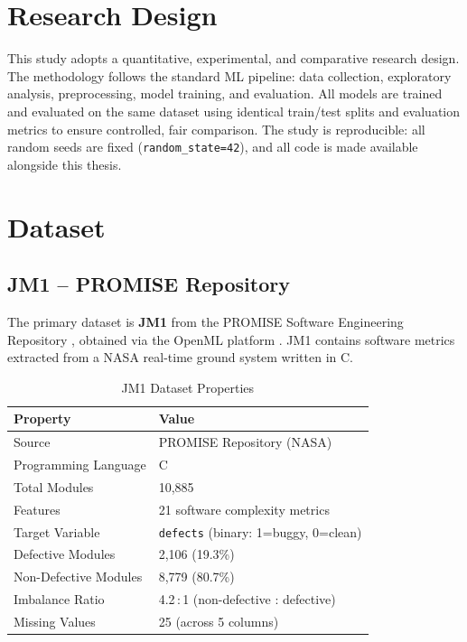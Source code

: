 \documentclass[12pt,a4paper,oneside]{report}
\begin{document}
\section{Research Design}

This study adopts a quantitative, experimental, and comparative research design. The methodology follows the standard ML pipeline: data collection, exploratory analysis, preprocessing, model training, and evaluation. All models are trained and evaluated on the same dataset using identical train/test splits and evaluation metrics to ensure controlled, fair comparison. The study is reproducible: all random seeds are fixed (\texttt{random\_state=42}), and all code is made available alongside this thesis.

\section{Dataset}

\subsection{JM1 -- PROMISE Repository}

The primary dataset is \textbf{JM1} from the PROMISE Software Engineering Repository \citep{promise}, obtained via the OpenML platform \citep{openml}. JM1 contains software metrics extracted from a NASA real-time ground system written in C.

\begin{table}[H]
  \centering
  \caption{JM1 Dataset Properties}
  \label{tab:jm1_properties}
  \begin{tabular}{L{55mm}L{80mm}}
    \toprule
    \textbf{Property} & \textbf{Value} \\
    \midrule
    Source                & PROMISE Repository (NASA) \\
    Programming Language  & C \\
    Total Modules         & 10,885 \\
    Features              & 21 software complexity metrics \\
    Target Variable       & \texttt{defects} (binary: 1=buggy, 0=clean) \\
    Defective Modules     & 2,106 \quad (19.3\%) \\
    Non-Defective Modules & 8,779 \quad (80.7\%) \\
    Imbalance Ratio       & 4.2\,:\,1 \quad (non-defective : defective) \\
    Missing Values        & 25 \quad (across 5 columns) \\
    \bottomrule
  \end{tabular}
\end{table}
\end{document}
